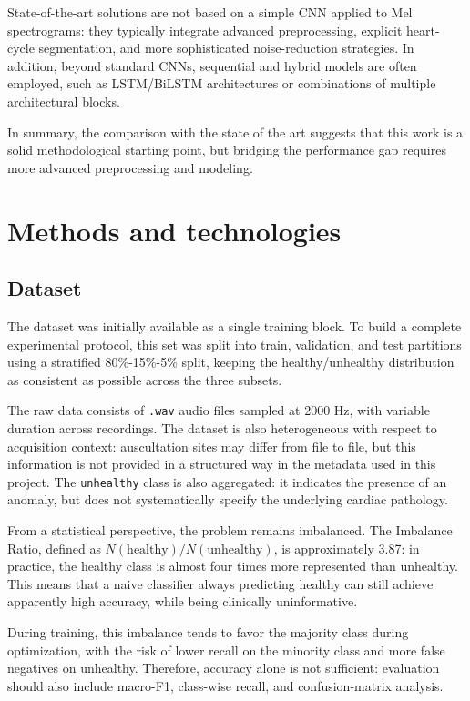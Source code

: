\documentclass[12pt,a4paper]{article}
\begin{document}
State-of-the-art solutions are not based on a simple CNN applied to Mel spectrograms: they
typically integrate advanced preprocessing, explicit heart-cycle segmentation, and more
sophisticated noise-reduction strategies. In addition, beyond standard CNNs, sequential and
hybrid models are often employed, such as LSTM/BiLSTM architectures or combinations of
multiple architectural blocks.

In summary, the comparison with the state of the art suggests that this work is a solid
methodological starting point, but bridging the performance gap requires more advanced
preprocessing and modeling.

\section{Methods and technologies}
\subsection{Dataset}
The dataset was initially available as a single training block. To build a complete
experimental protocol, this set was split into train, validation, and test partitions using
a stratified 80\%-15\%-5\% split, keeping the healthy/unhealthy distribution as consistent as
possible across the three subsets.

The raw data consists of \texttt{.wav} audio files sampled at 2000 Hz, with variable duration
across recordings. The dataset is also heterogeneous with respect to acquisition context:
auscultation sites may differ from file to file, but this information is not provided in a
structured way in the metadata used in this project. The \texttt{unhealthy} class is also
aggregated: it indicates the presence of an anomaly, but does not systematically specify
the underlying cardiac pathology.

From a statistical perspective, the problem remains imbalanced. The Imbalance Ratio, defined
as \(N(\text{healthy}) / N(\text{unhealthy})\), is approximately 3.87: in practice, the
healthy class is almost four times more represented than unhealthy. This means that a naive
classifier always predicting healthy can still achieve apparently high accuracy, while being
clinically uninformative.

During training, this imbalance tends to favor the majority class during optimization, with
the risk of lower recall on the minority class and more false negatives on unhealthy.
Therefore, accuracy alone is not sufficient: evaluation should also include macro-F1,
class-wise recall, and confusion-matrix analysis.
\end{document}
